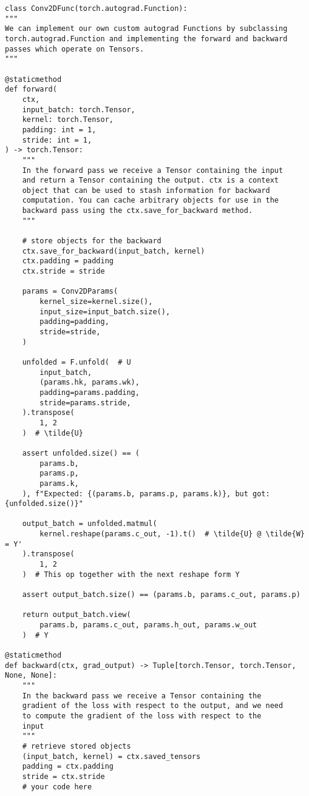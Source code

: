 \documentclass{article}
\begin{document}
\begin{verbatim}
class Conv2DFunc(torch.autograd.Function):
"""
We can implement our own custom autograd Functions by subclassing
torch.autograd.Function and implementing the forward and backward
passes which operate on Tensors.
"""

@staticmethod
def forward(
    ctx,
    input_batch: torch.Tensor,
    kernel: torch.Tensor,
    padding: int = 1,
    stride: int = 1,
) -> torch.Tensor:
    """
    In the forward pass we receive a Tensor containing the input
    and return a Tensor containing the output. ctx is a context
    object that can be used to stash information for backward
    computation. You can cache arbitrary objects for use in the
    backward pass using the ctx.save_for_backward method.
    """

    # store objects for the backward
    ctx.save_for_backward(input_batch, kernel)
    ctx.padding = padding
    ctx.stride = stride

    params = Conv2DParams(
        kernel_size=kernel.size(),
        input_size=input_batch.size(),
        padding=padding,
        stride=stride,
    )

    unfolded = F.unfold(  # U
        input_batch,
        (params.hk, params.wk),
        padding=params.padding,
        stride=params.stride,
    ).transpose(
        1, 2
    )  # \tilde{U}

    assert unfolded.size() == (
        params.b,
        params.p,
        params.k,
    ), f"Expected: {(params.b, params.p, params.k)}, but got: {unfolded.size()}"

    output_batch = unfolded.matmul(
        kernel.reshape(params.c_out, -1).t()  # \tilde{U} @ \tilde{W} = Y'
    ).transpose(
        1, 2
    )  # This op together with the next reshape form Y

    assert output_batch.size() == (params.b, params.c_out, params.p)

    return output_batch.view(
        params.b, params.c_out, params.h_out, params.w_out
    )  # Y

@staticmethod
def backward(ctx, grad_output) -> Tuple[torch.Tensor, torch.Tensor, None, None]:
    """
    In the backward pass we receive a Tensor containing the
    gradient of the loss with respect to the output, and we need
    to compute the gradient of the loss with respect to the
    input
    """
    # retrieve stored objects
    (input_batch, kernel) = ctx.saved_tensors
    padding = ctx.padding
    stride = ctx.stride
    # your code here


\end{verbatim}
\end{document}
